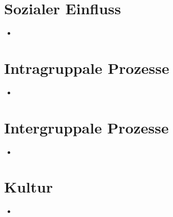 \documentclass[11pt, paper=a4, twocolumn]{scrartcl}
\begin{document}
	\section{Sozialer Einfluss}
		\begin{itemize}
			\item
		\end{itemize}



	\section{Intragruppale Prozesse}
		\begin{itemize}
			\item
		\end{itemize}


	\section{Intergruppale Prozesse}
		\begin{itemize}
			\item
		\end{itemize}


	\section{Kultur}
		\begin{itemize}
			\item
		\end{itemize}
\end{document}

